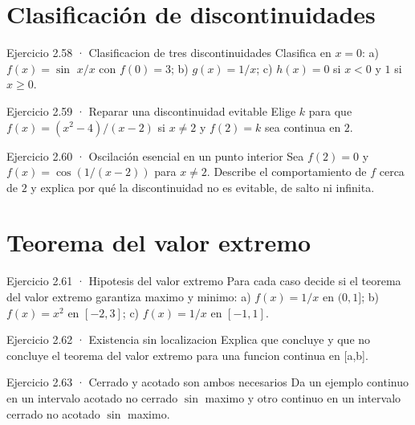 \documentclass[10pt,a4paper,oneside,openany]{book}
\begin{document}
\section{Clasificación de discontinuidades}
\begin{PSevenExerciseFixed}{Ejercicio 2.58 · Clasificacion de tres discontinuidades}
Clasifica en \(x=0\): a) \(f(x)=\sin\) \(x/x\) con \(f(0)=3\); b) \(g(x)=1/x\); c) \(h(x)=0\) si \(x<0\) y \(1\) si \(x\ge 0\).
\end{PSevenExerciseFixed}
\begin{PSevenExerciseFixed}{Ejercicio 2.59 · Reparar una discontinuidad evitable}
Elige \(k\) para que \(f(x)=(x^{2}-4)/(x-2)\) si \(x\ne 2\) y \(f(2)=k\) sea continua en \(2\).
\end{PSevenExerciseFixed}
\begin{PSevenExerciseFixed}{Ejercicio 2.60 · Oscilación esencial en un punto interior}
Sea \(f(2)=0\) y \(f(x)=\cos(1/(x-2))\) para \(x\ne2\). Describe el comportamiento de \(f\) cerca de \(2\) y explica por qué la discontinuidad no es evitable, de salto ni infinita.
\end{PSevenExerciseFixed}
\section{Teorema del valor extremo}
\begin{PSevenExerciseFixed}{Ejercicio 2.61 · Hipotesis del valor extremo}
Para cada caso decide si el teorema del valor extremo garantiza maximo y minimo: a) \(f(x)=1/x\) en \((0,1]\); b) \(f(x)=x^{2}\) en \([-2,3]\); c) \(f(x)=1/x\) en \([-1,1]\).
\end{PSevenExerciseFixed}
\begin{PSevenExerciseFixed}{Ejercicio 2.62 · Existencia sin localizacion}
Explica que concluye y que no concluye el teorema del valor extremo para una funcion continua en [a,b].
\end{PSevenExerciseFixed}
\begin{PSevenExerciseFixed}{Ejercicio 2.63 · Cerrado y acotado son ambos necesarios}
Da un ejemplo continuo en un intervalo acotado no cerrado \(\sin\) maximo y otro continuo en un intervalo cerrado no acotado \(\sin\) maximo.
\end{PSevenExerciseFixed}
\end{document}
